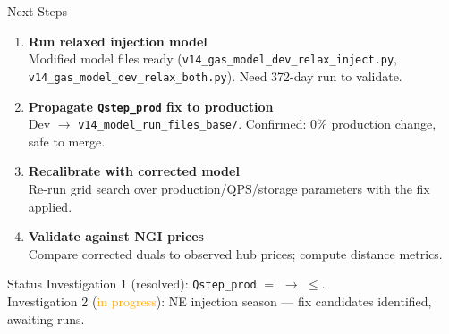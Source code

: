 \documentclass[aspectratio=169, 11pt]{beamer}
\begin{document}
\begin{frame}{Next Steps}
  \begin{enumerate}
    \item \textbf{Run relaxed injection model} \\
      {\small Modified model files ready (\texttt{v14\_gas\_model\_dev\_relax\_inject.py}, \\\texttt{v14\_gas\_model\_dev\_relax\_both.py}). Need 372-day run to validate.}
    \vspace{0.4em}
    \item \textbf{Propagate \texttt{Qstep\_prod} fix to production} \\
      {\small Dev $\to$ \texttt{v14\_model\_run\_files\_base/}. Confirmed: 0\% production change, safe to merge.}
    \vspace{0.4em}
    \item \textbf{Recalibrate with corrected model} \\
      {\small Re-run grid search over production/QPS/storage parameters with the fix applied.}
    \vspace{0.4em}
    \item \textbf{Validate against NGI prices} \\
      {\small Compare corrected duals to observed hub prices; compute distance metrics.}
  \end{enumerate}

  \vspace{0.5em}
  \begin{block}{Status}
    Investigation 1 (\textcolor{okgreen}{resolved}): \texttt{Qstep\_prod} $=$ $\to$ $\leq$. \\
    Investigation 2 (\textcolor{orange}{in progress}): NE injection season --- fix candidates identified, awaiting runs.
  \end{block}
\end{frame}
\end{document}
